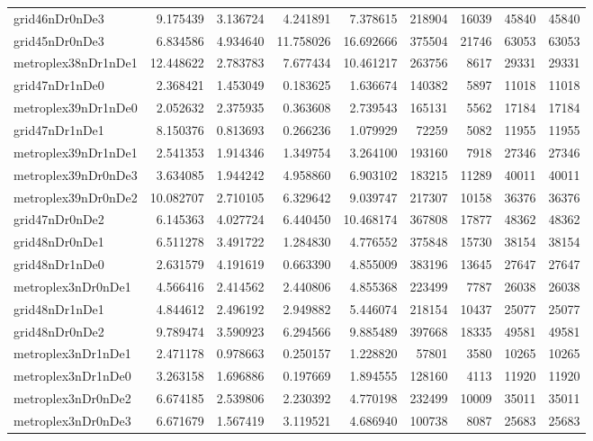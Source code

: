 \begin{longtable}{|l|r|r|r|r|r|r|r|r|}
grid46nDr0nDe3 & 9.175439 & 3.136724 & 4.241891 & 7.378615 & 218904 & 16039 & 45840 & 45840 \\
grid45nDr0nDe3 & 6.834586 & 4.934640 & 11.758026 & 16.692666 & 375504 & 21746 & 63053 & 63053 \\
metroplex38nDr1nDe1 & 12.448622 & 2.783783 & 7.677434 & 10.461217 & 263756 & 8617 & 29331 & 29331 \\
grid47nDr1nDe0 & 2.368421 & 1.453049 & 0.183625 & 1.636674 & 140382 & 5897 & 11018 & 11018 \\
metroplex39nDr1nDe0 & 2.052632 & 2.375935 & 0.363608 & 2.739543 & 165131 & 5562 & 17184 & 17184 \\
grid47nDr1nDe1 & 8.150376 & 0.813693 & 0.266236 & 1.079929 & 72259 & 5082 & 11955 & 11955 \\
metroplex39nDr1nDe1 & 2.541353 & 1.914346 & 1.349754 & 3.264100 & 193160 & 7918 & 27346 & 27346 \\
metroplex39nDr0nDe3 & 3.634085 & 1.944242 & 4.958860 & 6.903102 & 183215 & 11289 & 40011 & 40011 \\
metroplex39nDr0nDe2 & 10.082707 & 2.710105 & 6.329642 & 9.039747 & 217307 & 10158 & 36376 & 36376 \\
grid47nDr0nDe2 & 6.145363 & 4.027724 & 6.440450 & 10.468174 & 367808 & 17877 & 48362 & 48362 \\
grid48nDr0nDe1 & 6.511278 & 3.491722 & 1.284830 & 4.776552 & 375848 & 15730 & 38154 & 38154 \\
grid48nDr1nDe0 & 2.631579 & 4.191619 & 0.663390 & 4.855009 & 383196 & 13645 & 27647 & 27647 \\
metroplex3nDr0nDe1 & 4.566416 & 2.414562 & 2.440806 & 4.855368 & 223499 & 7787 & 26038 & 26038 \\
grid48nDr1nDe1 & 4.844612 & 2.496192 & 2.949882 & 5.446074 & 218154 & 10437 & 25077 & 25077 \\
grid48nDr0nDe2 & 9.789474 & 3.590923 & 6.294566 & 9.885489 & 397668 & 18335 & 49581 & 49581 \\
metroplex3nDr1nDe1 & 2.471178 & 0.978663 & 0.250157 & 1.228820 & 57801 & 3580 & 10265 & 10265 \\
metroplex3nDr1nDe0 & 3.263158 & 1.696886 & 0.197669 & 1.894555 & 128160 & 4113 & 11920 & 11920 \\
metroplex3nDr0nDe2 & 6.674185 & 2.539806 & 2.230392 & 4.770198 & 232499 & 10009 & 35011 & 35011 \\
metroplex3nDr0nDe3 & 6.671679 & 1.567419 & 3.119521 & 4.686940 & 100738 & 8087 & 25683 & 25683 \\

\end{longtable}
